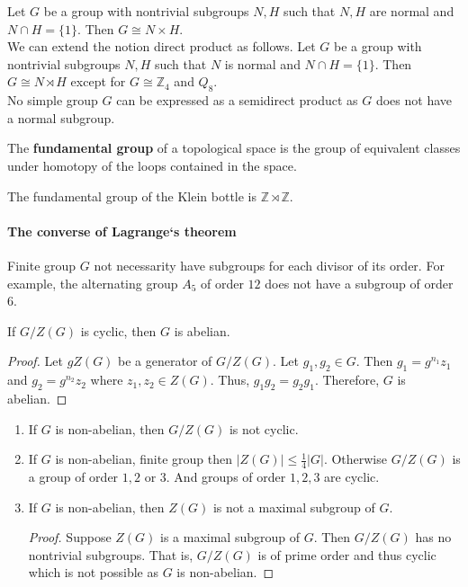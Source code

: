 	Let $G$ be a group with nontrivial subgroups $N,H$ such that $N,H$ are normal and $N \cap H = \{ 1 \}$. Then $G \cong N \times H$.\\

	We can extend the notion direct product as follows.
	Let $G$ be a group with nontrivial subgroups $N,H$ such that $N$ is normal and $N \cap H = \{ 1 \}$. Then $G \cong N \rtimes H$ except for $G \cong \mathbb{Z}_4$ and $Q_8$.\\

	No simple group $G$ can be expressed as a semidirect product as $G$ does not have a normal subgroup.
	
\begin{definition}
	The \textbf{fundamental group} of a topological space is the group of equivalent classes under homotopy of the loops contained in the space.
\end{definition}

	The fundamental group of the Klein bottle is $\mathbb{Z} \rtimes \mathbb{Z}$.\\

\paragraph{The converse of Lagrange`s theorem} Finite group $G$ not necessarity have subgroups for each divisor of its order.
	For example, the alternating group $A_5$ of order $12$ does not have a subgroup of order $6$.

\begin{theorem}
	If $G/Z(G)$ is cyclic, then $G$ is abelian.
\end{theorem}
\begin{proof}
	Let $gZ(G)$ be a generator of $G/Z(G)$. Let $g_1,g_2 \in G$. Then $g_1 = g^{n_1}z_1$ and $g_2 = g^{n_2}z_2$ where $z_1,z_2 \in Z(G)$.
	Thus, $g_1g_2 = g_2g_1$. Therefore, $G$ is abelian.
\end{proof}

\begin{enumerate}
	\item If $G$ is non-abelian, then $G/Z(G)$ is not cyclic.
	\item If $G$ is non-abelian, finite group then $|Z(G)| \le \frac{1}{4}|G|$. Otherwise $G/Z(G)$ is a group of order $1,2$ or $3$. And groups of order $1,2,3$ are cyclic.
	\item If $G$ is non-abelian, then $Z(G)$ is not a maximal subgroup of $G$.
	\begin{proof}
		Suppose $Z(G)$ is a maximal subgroup of $G$.
		Then $G/Z(G)$ has no nontrivial subgroups.
		That is, $G/Z(G)$ is of prime order and thus cyclic which is not possible as $G$ is non-abelian.
	\end{proof}
\end{enumerate}

